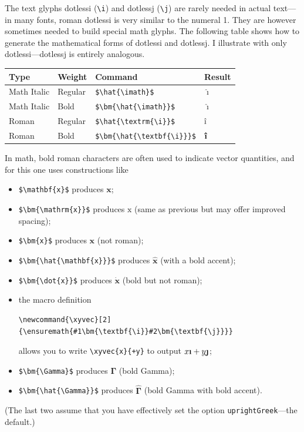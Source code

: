 \documentclass[11pt]{article}
\begin{document}
The text glyphs dotlessi (\verb|\i|) and dotlessj (\verb|\j|) are rarely needed in actual text---in many fonts, roman dotlessi is very similar to the numeral 1. They are however sometimes needed to build special math glyphs. The following table shows how to generate the mathematical forms of dotlessi and dotlessj. I illustrate with only dotlessi---dotlessj is entirely analogous.

\begin{center}
  \begin{tabular}{@{} llll @{}}
    \hline
    Type & Weight & Command & Result \\ 
    \hline
    Math Italic & Regular & \verb|$\hat{\imath}$| & $\hat{\imath}$ \\ 
    Math Italic & Bold & \verb|$\bm{\hat{\imath}}$| & $\bm{\hat{\imath}}$ \\ 
    Roman & Regular & \verb|$\hat{\textrm{\i}}$| & $\hat{\textrm{\i}}$\\ 
    Roman & Bold & \verb|$\bm{\hat{\textbf{\i}}}$| & $\bm{\hat{\textbf{\i}}}$\\ 
    \hline
  \end{tabular}
\end{center}
\newcommand{\xyvec}[2]{\ensuremath{#1\bm{\textbf{\i}}#2\bm{\textbf{\j}}}}

In math, bold roman characters are often used to indicate vector quantities, and for this one uses constructions like 
\begin{itemize}
\item
\verb|$\mathbf{x}$| produces $\mathbf{x}$;
\item
\verb|$\bm{\mathrm{x}}$| produces $\bm{\mathrm{x}}$ (same as previous but may offer improved spacing);
\item
\verb|$\bm{x}$| produces $\bm{x}$ (not roman);
\item
\verb|$\bm{\hat{\mathbf{x}}}$| produces $\bm{\hat{\mathbf{x}}}$ (with a bold accent);
\item \verb|$\bm{\dot{x}}$| produces $\bm{\dot{x}}$ (bold but not roman);
\item the macro definition
\begin{verbatim}
\newcommand{\xyvec}[2]{\ensuremath{#1\bm{\textbf{\i}}#2\bm{\textbf{\j}}}}
\end{verbatim}
allows you to write \verb|\xyvec{x}{+y}| to output $\xyvec{x}{+y}$;
\item \verb|$\bm{\Gamma}$| produces $\bm{\Gamma}$ (bold Gamma);
\item \verb|$\bm{\hat{\Gamma}}$| produces $\bm{\hat{\Gamma}}$ (bold Gamma with bold accent).
\end{itemize}
(The last two assume that you have effectively set the option {\tt uprightGreek}---the default.)
\end{document}
